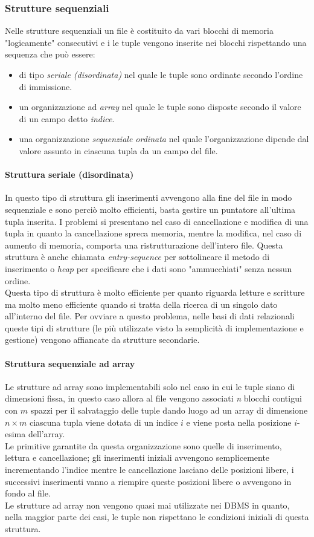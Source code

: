\subsubsection{Strutture sequenziali}
Nelle strutture sequenziali un file è costituito da vari blocchi di memoria "logicamente" consecutivi e i le tuple vengono inserite nei blocchi rispettando una sequenza che può essere:
\begin{itemize}
  \item di tipo \emph{seriale (disordinata)} nel quale le tuple sono ordinate secondo l'ordine di immissione.
  \item un organizzazione ad \emph{array} nel quale le tuple sono disposte secondo il valore di un campo detto \emph{indice}.
  \item una organizzazione \emph{sequenziale ordinata} nel quale l'organizzazione dipende dal valore assunto in ciascuna tupla da un campo del file.
\end{itemize}
\paragraph{Struttura seriale (disordinata)}
In questo tipo di struttura gli inserimenti avvengono alla fine del file in modo sequenziale e sono perciò molto efficienti, basta gestire un puntatore all'ultima tupla inserita. I problemi si presentano nel caso di cancellazione e modifica di una tupla in quanto la cancellazione spreca memoria, mentre la modifica, nel caso di aumento di memoria, comporta una ristrutturazione dell'intero file.
Questa struttura è anche chiamata \emph{entry-sequence} per sottolineare il metodo di inserimento o \emph{heap} per specificare che i dati sono "ammucchiati" senza nessun ordine.\\
Questa tipo di struttura è molto efficiente per quanto riguarda letture e scritture ma molto meno efficiente quando si tratta della ricerca di un singolo dato all'interno del file. Per ovviare a questo problema, nelle basi di dati relazionali queste tipi di strutture (le più utilizzate visto la semplicità di implementazione e gestione) vengono affiancate da strutture secondarie.
\paragraph{Struttura sequenziale ad array} Le strutture ad array sono implementabili solo nel caso in cui le tuple siano di dimensioni fissa, in questo caso allora al file vengono associati \emph{n} blocchi contigui con $m$ spazzi per il salvataggio delle tuple dando luogo ad un array di dimensione $n\times m$ ciascuna tupla viene dotata di un indice $i$ e viene posta nella posizione $i$-esima dell'array.\\
Le primitive garantite da questa organizzazione sono quelle di inserimento, lettura e cancellazione; gli inserimenti iniziali avvengono semplicemente incrementando l'indice mentre le cancellazione lasciano delle posizioni libere, i successivi inserimenti vanno a riempire queste posizioni libere o avvengono in fondo al file.\\
Le strutture ad array non vengono quasi mai utilizzate nei DBMS in quanto, nella maggior parte dei casi, le tuple non rispettano le condizioni iniziali di questa struttura.
